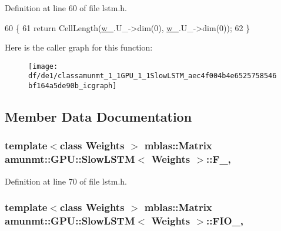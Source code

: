 Definition at line 60 of file lstm.\+h.


\begin{DoxyCode}
60                                               \{
61       \textcolor{keywordflow}{return} CellLength(\hyperlink{classamunmt_1_1GPU_1_1SlowLSTM_a200f343f4c27af61742a106f78f6d564}{w\_}.U\_->dim(0), \hyperlink{classamunmt_1_1GPU_1_1SlowLSTM_a200f343f4c27af61742a106f78f6d564}{w\_}.U\_->dim(0));
62     \}
\end{DoxyCode}


Here is the caller graph for this function\+:
\nopagebreak
\begin{figure}[H]
\begin{center}
\leavevmode
\texttt{[image: df/de1/classamunmt\_1\_1GPU\_1\_1SlowLSTM\_aec4f004b4e6525758546bf164a5de90b\_icgraph]}
\end{center}
\end{figure}




\subsection{Member Data Documentation}
\subsubsection[{\texorpdfstring{F\+\_\+}{F_}}]{\setlength{\rightskip}{0pt plus 5cm}template$<$class Weights $>$ {\bf mblas\+::\+Matrix} {\bf amunmt\+::\+G\+P\+U\+::\+Slow\+L\+S\+TM}$<$ {\bf Weights} $>$\+::F\+\_\+\hspace{0.3cm}{\ttfamily [mutable]}, {\ttfamily [private]}}\hypertarget{classamunmt_1_1GPU_1_1SlowLSTM_abe8f110d7c7d770c0e80ceb720a81750}{}\label{classamunmt_1_1GPU_1_1SlowLSTM_abe8f110d7c7d770c0e80ceb720a81750}


Definition at line 70 of file lstm.\+h.

\subsubsection[{\texorpdfstring{F\+I\+O\+\_\+}{FIO_}}]{\setlength{\rightskip}{0pt plus 5cm}template$<$class Weights $>$ {\bf mblas\+::\+Matrix} {\bf amunmt\+::\+G\+P\+U\+::\+Slow\+L\+S\+TM}$<$ {\bf Weights} $>$\+::F\+I\+O\+\_\+\hspace{0.3cm}{\ttfamily [mutable]}, {\ttfamily [private]}}\hypertarget{classamunmt_1_1GPU_1_1SlowLSTM_aa80d0bb5090fbe2a89b7117f89433b57}{}\label{classamunmt_1_1GPU_1_1SlowLSTM_aa80d0bb5090fbe2a89b7117f89433b57}


